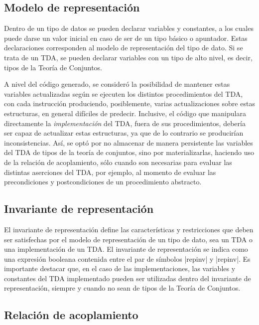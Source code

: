 {{\subsection{Modelo de representación}

Dentro de un tipo de datos se pueden declarar variables y constantes, a los
cuales puede darse un valor inicial en caso de ser de un tipo básico o
apuntador. Estas declaraciones corresponden al modelo de representación del tipo
de dato. Si se trata de un TDA, se pueden declarar variables con un tipo de alto
nivel, es decir, tipos de la Teoría de Conjuntos.

A nivel del código generado, se consideró la posibilidad de mantener estas
variables actualizadas según se ejecuten los distintos procedimientos del TDA,
con cada instrucción produciendo, posiblemente, varias actualizaciones sobre
estas estructuras, en general difíciles de predecir. Inclusive, el código que
manipulara directamente la \textit{implementación} del TDA, fuera de sus
procedimientos, debería ser capaz de actualizar estas estructuras, ya que de lo
contrario se producirían inconsistencias. Así, se optó por no almacenar de
manera persistente las variables del TDA de tipos de la teoría de conjuntos,
sino por materializarlas, haciendo uso de la relación de acoplamiento, sólo
cuando son necesarias para evaluar las distintas aserciones del TDA, por
ejemplo, al momento de evaluar las precondiciones y postcondiciones de un
procedimiento abstracto.

\subsection{Invariante de representación}

El invariante de representación define las características y restricciones que
deben ser satisfechas por el modelo de representación de un tipo de dato, sea un
TDA o una implementación de un TDA. El invariante de representación se indica
como una expresión booleana contenida entre el par de símbolos \ingra|{repinv|
y \ingra|repinv}|. Es importante destacar que, en el caso de las
implementaciones, las variables y constantes del TDA implementado pueden ser
utilizadas dentro del invariante de representación, siempre y cuando no sean de
tipos de la Teoría de Conjuntos.

\subsection{Relación de acoplamiento}

}}
